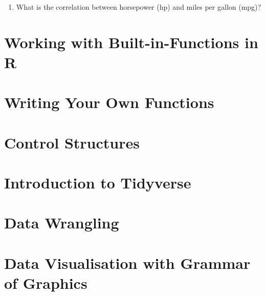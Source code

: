 \documentclass[
  letterpaper,
  DIV=11,
  numbers=noendperiod]{scrreprt}
\providecommand{\tightlist}{%
  \setlength{\itemsep}{0pt}\setlength{\parskip}{0pt}}\usepackage{longtable,booktabs,array}
\begin{document}
\begin{enumerate}
\def\labelenumi{\arabic{enumi}.}
\setcounter{enumi}{20}
\tightlist
\item
  What is the correlation between horsepower (hp) and miles per gallon
  (mpg)?
\end{enumerate}


\hypertarget{working-with-built-in-functions-in-r}{%
\chapter{Working with Built-in-Functions in
R}\label{working-with-built-in-functions-in-r}}


\hypertarget{writing-your-own-functions}{%
\chapter{Writing Your Own Functions}\label{writing-your-own-functions}}


\hypertarget{control-structures}{%
\chapter{Control Structures}\label{control-structures}}


\hypertarget{introduction-to-tidyverse}{%
\chapter{Introduction to Tidyverse}\label{introduction-to-tidyverse}}


\hypertarget{data-wrangling}{%
\chapter{Data Wrangling}\label{data-wrangling}}


\hypertarget{data-visualisation-with-grammar-of-graphics}{%
\chapter{Data Visualisation with Grammar of
Graphics}\label{data-visualisation-with-grammar-of-graphics}}
\end{document}
